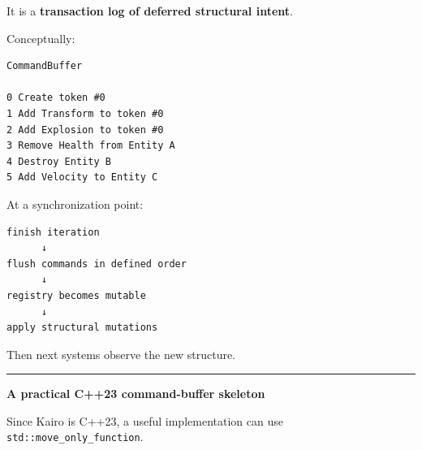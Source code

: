 It is a \textbf{transaction log of deferred structural intent}.

Conceptually:

\begin{verbatim}
CommandBuffer

0 Create token #0
1 Add Transform to token #0
2 Add Explosion to token #0
3 Remove Health from Entity A
4 Destroy Entity B
5 Add Velocity to Entity C
\end{verbatim}

At a synchronization point:

\begin{verbatim}
finish iteration
      ↓
flush commands in defined order
      ↓
registry becomes mutable
      ↓
apply structural mutations
\end{verbatim}

Then next systems observe the new structure.

\begin{center}\rule{0.5\linewidth}{0.5pt}\end{center}

\textbf{A practical C++23 command-buffer skeleton}

Since Kairo is C++23, a useful implementation can use \texttt{std::move\_only\_function}.

